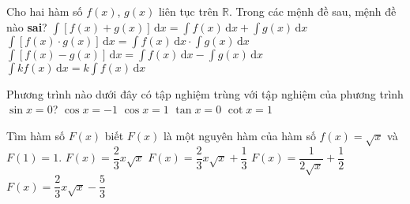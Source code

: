 \begin{ex}%
	Cho hai hàm số $f(x)$, $g(x)$ liên tục trên $\mathbb{R}$. Trong các mệnh đề sau, mệnh đề nào \textbf{sai}?
	\choice
	{$\displaystyle \int [f(x)+g(x)] \mathrm{\,d}x= \displaystyle \int f(x) \mathrm{\,d}x+ \displaystyle \int g(x) \mathrm{\,d}x$}
	{\True $\displaystyle \int [f(x)\cdot g(x)] \mathrm{\,d}x= \displaystyle \int f(x) \mathrm{\,d}x \cdot \displaystyle \int g(x) \mathrm{\,d}x$}
	{$\displaystyle \int [f(x)-g(x)] \mathrm{\,d}x= \displaystyle \int f(x) \mathrm{\,d}x- \displaystyle \int g(x) \mathrm{\,d}x$}
	{$\displaystyle \int kf(x) \mathrm{\,d}x=k \displaystyle \int f(x) \mathrm{\,d}x$}
\end{ex}
\begin{ex}%
	Phương trình nào dưới đây có tập nghiệm trùng với tập nghiệm của phương trình $\sin x=0$?
	\choice
	{$\cos x=-1$}
	{$\cos x=1$}
	{\True $\tan x=0$}
	{$\cot x=1$}
\end{ex}
\begin{ex}%
	Tìm hàm số $F(x)$ biết $F(x)$ là một nguyên hàm của hàm số $f(x)= \sqrt{x}$ và $F(1)=1$.
	\choice
	{$F(x)= \dfrac{2}{3}x \sqrt{x}$}
	{\True $F(x)= \dfrac{2}{3}x \sqrt{x}+ \dfrac{1}{3}$}
	{$F(x)= \dfrac{1}{2\sqrt{x}}+ \dfrac{1}{2}$}
	{$F(x)= \dfrac{2}{3}x \sqrt{x}- \dfrac{5}{3}$}
\end{ex}

